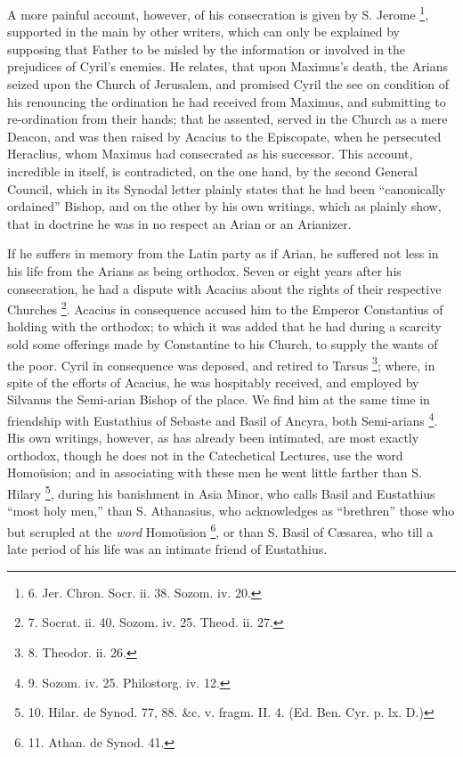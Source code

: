 A more painful account,
however, of his consecration is given by S. Jerome \footnote{6. Jer.
Chron. Socr. ii. 38. Sozom. iv. 20.}, supported in the main by other writers, which can only be
explained by supposing that Father to be misled by the information or
involved in the prejudices of Cyril's enemies. He relates, that upon
Maximus's death, the Arians seized upon the Church of Jerusalem,
and promised Cyril the see on condition of his renouncing the
ordination he had received from Maximus, and submitting to
re-ordination from their hands; that he assented, served in the Church
as a mere Deacon, and was then raised by Acacius to the Episcopate,
when he persecuted Heraclius, whom Maximus had consecrated as his
successor. This account, incredible in itself, is contradicted, on the
one hand, by the second General Council, which in its Synodal letter
plainly states that he had been ``canonically ordained'' Bishop, and on
the other by his own writings, which as plainly show, that in doctrine
he was in no respect an Arian or an Arianizer.

If he suffers in memory from
the Latin party as if Arian, he suffered not less in his life from the
Arians as being orthodox. Seven or eight years after his consecration,
he had a dispute with Acacius about the rights of their respective
Churches \footnote{7. Socrat.
ii. 40. Sozom. iv. 25. Theod. ii. 27.}. Acacius in
consequence accused him to the Emperor Constantius of holding with the
orthodox; to which it was added that he had during a scarcity sold
some offerings made by Constantine to his Church, to supply the wants
of the poor. Cyril in consequence was deposed, and retired to Tarsus \footnote{8. Theodor.
ii. 26.}; where, in spite of the efforts of Acacius, he was hospitably
received, and employed by Silvanus the Semi-arian Bishop of the place.
We find him at the same time in friendship with Eustathius of Sebaste
and Basil of Ancyra, both Semi-arians \footnote{9. Sozom.
iv. 25. Philostorg. iv. 12.}. His own writings, however, as has already been intimated, are
most exactly orthodox, though he does not in the Catechetical
Lectures, use the word Homoüsion; and in associating with these men
he went little farther than S. Hilary \footnote{10. Hilar.
de Synod. 77, 88. \&c. v. fragm. II. 4. (Ed. Ben. Cyr. p. lx. D.)}, during his banishment in Asia Minor, who calls Basil and
Eustathius ``most holy men,'' than S. Athanasius, who acknowledges as ``brethren''
those who but scrupled at the \emph{word} Homoüsion \footnote{11. Athan.
de Synod. 41.}, or than S. Basil of Cæsarea, who till a late period of
his life was an intimate friend of Eustathius.

